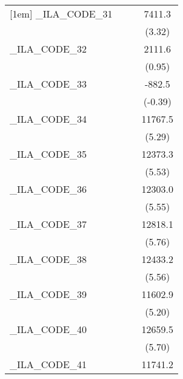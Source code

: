 {\begin{tabular}{l*{3}{c}}
[1em]
\_ILA\_CODE\_31&                     &                     &      7411.3\sym{***}\\
            &                     &                     &      (3.32)         \\
[1em]
\_ILA\_CODE\_32&                     &                     &      2111.6         \\
            &                     &                     &      (0.95)         \\
[1em]
\_ILA\_CODE\_33&                     &                     &      -882.5         \\
            &                     &                     &     (-0.39)         \\
[1em]
\_ILA\_CODE\_34&                     &                     &     11767.5\sym{***}\\
            &                     &                     &      (5.29)         \\
[1em]
\_ILA\_CODE\_35&                     &                     &     12373.3\sym{***}\\
            &                     &                     &      (5.53)         \\
[1em]
\_ILA\_CODE\_36&                     &                     &     12303.0\sym{***}\\
            &                     &                     &      (5.55)         \\
[1em]
\_ILA\_CODE\_37&                     &                     &     12818.1\sym{***}\\
            &                     &                     &      (5.76)         \\
[1em]
\_ILA\_CODE\_38&                     &                     &     12433.2\sym{***}\\
            &                     &                     &      (5.56)         \\
[1em]
\_ILA\_CODE\_39&                     &                     &     11602.9\sym{***}\\
            &                     &                     &      (5.20)         \\
[1em]
\_ILA\_CODE\_40&                     &                     &     12659.5\sym{***}\\
            &                     &                     &      (5.70)         \\
[1em]
\_ILA\_CODE\_41&                     &                     &     11741.2\sym{***}\\

\end{tabular}}
